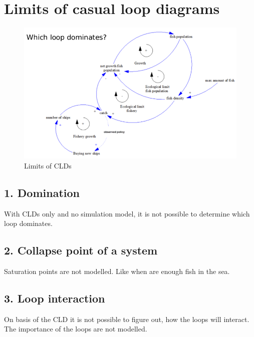 \hypertarget{limits-of-casual-loop-diagrams}{%
\section{Limits of casual loop
diagrams}\label{limits-of-casual-loop-diagrams}}

\begin{figure}
\centering
\includegraphics{figures/limitsCld.png}
\caption{Limits of CLDs}
\end{figure}

\hypertarget{domination}{%
\subsection{1. Domination}\label{domination}}

With CLDs only and no simulation model, it is not possible to determine
which loop dominates.

\hypertarget{collapse-point-of-a-system}{%
\subsection{2. Collapse point of a
system}\label{collapse-point-of-a-system}}

Saturation points are not modelled. Like when are enough fish in the
sea.

\hypertarget{loop-interaction}{%
\subsection{3. Loop interaction}\label{loop-interaction}}

On basis of the CLD it is not possible to figure out, how the loops will
interact. The importance of the loops are not modelled.

